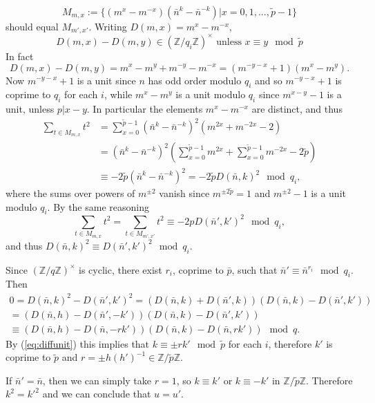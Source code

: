 \documentclass[a4paper, 10pt]{book}
\theoremstyle{definition}
\numberwithin{equation}{chapter}
\newcommand\inv{^{-1}}
\newcommand\ZZ{\mathbb Z}
\newcommand{\pb}{\bar{p}}
\newcommand{\nb}{\bar{n}}
\newcommand{\pt}{\tilde{p}}
\newcommand{\nt}{m}
\begin{document}
\begin{equation*} 	
	M_{\nt,x}:=\{(\nt^x - \nt^{-x})(\nb^k-\nb^{-k})| x = 0,1,...,\pt-1\} 
\end{equation*}
should equal $M_{\nt',x'}$. Writing $D(\nt,x) = \nt^x-\nt^{-x}$, 
\begin{equation}
  \label{eq:diffunit}
  D(\nt,x)-D(\nt,y)\in(\ZZ/q_i\ZZ)^\times \text{ unless }x\equiv y\mod \pt
\end{equation}
In fact
\begin{equation*}
    D(\nt,x)-D(\nt,y)=\nt^x-\nt^y+\nt^{-y}-\nt^{-x}=(\nt^{-y-x}+1)(\nt^x-\nt^y).
 \end{equation*}
 Now $\nt^{-y-x}+1$ is a unit since $n$ has odd order modulo $q_i$ and so $\nt^{-y-x}+1$ is coprime to $q_i$ for each $i$, while $\nt^x-\nt^y$ is a unit modulo $q_i$ since $\nt^{x-y}-1$ is a unit, unless $p|x-y$. In particular the elements $\nt^x-\nt^{-x}$ are distinct, and thus
\begin{align*}
  \sum_{t\in M_{\nt,x}}t^2&=\sum_{x=0}^{\pt-1}(\nb^{k}-\nb^{-k})^2(\nt^{2x}+\nt^{-2x}-2)\\
                  &=(\nb^{k}-\nb^{-k})^2\left(\sum_{x=0}^{\pt-1}\nt^{2x}+\sum_{x=0}^{\pt-1}\nt^{-2x}-2\pt\right)\\
  &\equiv -2\pt(\nb^{k}-\nb^{-k})^2=-2\pt D(\nb,k)^2\mod q_i,
\end{align*}
where the sums over powers of $\nt^{\pm 2}$ vanish since $\nt^{\pm 2\pt}=1$ and $\nt^{\pm 2}-1$ is a unit modulo $q_i$. By the same reasoning
\begin{equation*}
  \sum_{t\in M_{\nt,x}}t^2=\sum_{t\in M_{\nt',x'}}t^2\equiv -2pD(\nb',k')^2\mod q_i,
\end{equation*}
and thus $D(\nb,k)^2\equiv D(\nb',k')^2\mod q_i$.

Since $(\ZZ/q\ZZ)^\times$ is cyclic, there exist $r_i$, coprime to $\pb$, such that $\nb'\equiv \nb^{r_i}\mod q_i$. Then
\begin{multline*} 0=D(\nb,k)^2-D(\nb',k')^2=(D(\nb,k)+D(\nb',k))(D(\nb,k)-D(\nb',k'))\\=(D(\nb,h)-D(\nb',-k'))(D(\nb,k)-D(\nb',k'))\\\equiv(D(\nb,h)-D(\nb,-rk'))(D(\nb,k)-D(\nb,rk'))\mod q.
\end{multline*}
By (\cref{eq:diffunit}) this implies that $k\equiv\pm rk'\mod \pt$ for each $i$, therefore $k'$ is coprime to $\pt$ and $r=\pm h(h')\inv\in\ZZ/\pt\ZZ$.

If $\nb'=\nb$, then we can simply take $r=1$, so $k\equiv k'$ or $k\equiv -k'$ in $\ZZ/\pt\ZZ$. Therefore $k^2=k'^2$ and we can conclude that $u=u'$.
\end{document}
